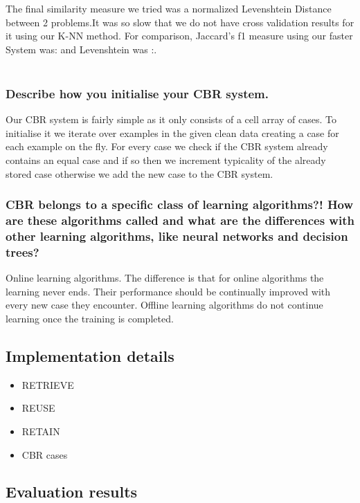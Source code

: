 \documentclass[12pt]{article}
\begin{document}
The final similarity measure we tried was a normalized Levenshtein Distance between 2 problems.It was so slow that we do not have cross validation results for it using our K-NN method. For comparison, Jaccard's f1 measure using our faster System was: and Levenshtein was :. \\ \\



\subsubsection*{Describe how you initialise your CBR system.}

Our CBR system is fairly simple as it only consists of a cell array of cases. To initialise it we iterate over examples in the given clean data creating a case for each example on the fly. For every case we check if the CBR system already contains an equal case and if so then we increment typicality of the already stored case otherwise we add the new case to the CBR system.

\subsubsection*{CBR belongs to a specific class of learning algorithms?! How are these algorithms called and what are the differences with other learning algorithms, like neural networks and decision trees?}

Online learning algorithms. The difference is that for online algorithms the learning never ends. Their performance should be continually improved with every new case they encounter. Offline learning algorithms do not continue learning once the training is completed.


\subsection*{Implementation details}
\begin{itemize}
  \item RETRIEVE
  \item REUSE
  \item RETAIN
  \item CBR cases
\end{itemize}


\subsection*{Evaluation results}
\end{document}

